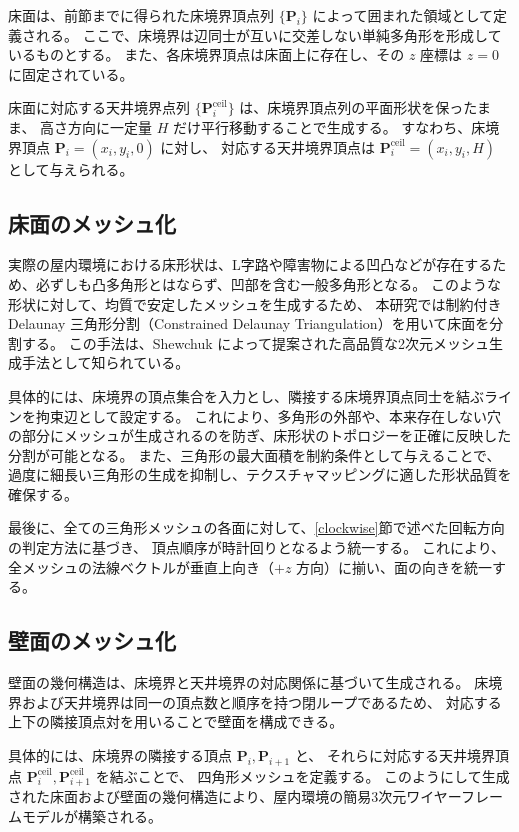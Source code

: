 床面は、前節までに得られた床境界頂点列 $\{\bm{P}_i\}$ によって囲まれた領域として定義される。
ここで、床境界は辺同士が互いに交差しない単純多角形を形成しているものとする。
また、各床境界頂点は床面上に存在し、その $z$ 座標は $z=0$ に固定されている。

床面に対応する天井境界点列 $\{\bm{P}_i^{\mathrm{ceil}}\}$ は、床境界頂点列の平面形状を保ったまま、
高さ方向に一定量 $H$ だけ平行移動することで生成する。
すなわち、床境界頂点 $\bm{P}_i = (x_i, y_i, 0)$ に対し、
対応する天井境界頂点は $\bm{P}_i^{\mathrm{ceil}} = (x_i, y_i, H)$ として与えられる。

\subsection{床面のメッシュ化}

実際の屋内環境における床形状は、L字路や障害物による凹凸などが存在するため、必ずしも凸多角形とはならず、凹部を含む一般多角形となる。
このような形状に対して、均質で安定したメッシュを生成するため、
本研究では制約付き Delaunay 三角形分割（Constrained Delaunay Triangulation）を用いて床面を分割する。
この手法は、Shewchuk によって提案された高品質な2次元メッシュ生成手法として知られている\cite{Shewchuk1996Triangle}。

具体的には、床境界の頂点集合を入力とし、隣接する床境界頂点同士を結ぶラインを拘束辺として設定する。
これにより、多角形の外部や、本来存在しない穴の部分にメッシュが生成されるのを防ぎ、床形状のトポロジーを正確に反映した分割が可能となる。
また、三角形の最大面積を制約条件として与えることで、過度に細長い三角形の生成を抑制し、テクスチャマッピングに適した形状品質を確保する。

最後に、全ての三角形メッシュの各面に対して、\ref{clockwise}節で述べた回転方向の判定方法に基づき、
頂点順序が時計回りとなるよう統一する。
これにより、全メッシュの法線ベクトルが垂直上向き（$+z$ 方向）に揃い、面の向きを統一する。

\subsection{壁面のメッシュ化}

壁面の幾何構造は、床境界と天井境界の対応関係に基づいて生成される。
床境界および天井境界は同一の頂点数と順序を持つ閉ループであるため、
対応する上下の隣接頂点対を用いることで壁面を構成できる。

具体的には、床境界の隣接する頂点 $\bm{P}_i, \bm{P}_{i+1}$ と、
それらに対応する天井境界頂点 $\bm{P}_i^{\mathrm{ceil}}, \bm{P}_{i+1}^{\mathrm{ceil}}$ を結ぶことで、
四角形メッシュを定義する。
このようにして生成された床面および壁面の幾何構造により、屋内環境の簡易3次元ワイヤーフレームモデルが構築される。

